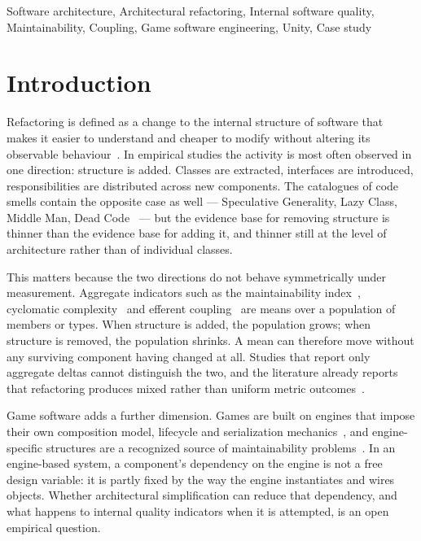 \documentclass{sbc2019}%
\begin{document}
\begin{frontmatter}
\begin{keywords}
Software architecture, Architectural refactoring, Internal software quality, Maintainability, Coupling, Game software engineering, Unity, Case study
\end{keywords}

\end{frontmatter}


\section{Introduction}

Refactoring is defined as a change to the internal structure of software that
makes it easier to understand and cheaper to modify without altering its
observable behaviour~\cite{fowler2018,mens2004}. In empirical studies the
activity is most often observed in one direction: structure is added. Classes
are extracted, interfaces are introduced, responsibilities are distributed
across new components. The catalogues of code smells contain the opposite case
as well --- Speculative Generality, Lazy Class, Middle Man, Dead Code~\cite{fowler2018}
--- but the evidence base for removing structure is thinner
than the evidence base for adding it, and thinner still at the level of
architecture rather than of individual classes.

This matters because the two directions do not behave symmetrically under
measurement. Aggregate indicators such as the maintainability index~\cite{coleman1994},
cyclomatic complexity~\cite{mccabe1976} and efferent
coupling~\cite{martin2003} are means over a population of members or types.
When structure is added, the population grows; when structure is removed, the
population shrinks. A mean can therefore move without any surviving component
having changed at all. Studies that report only aggregate deltas cannot
distinguish the two, and the literature already reports that refactoring
produces mixed rather than uniform metric outcomes~\cite{szoke2017,bavota2015,palomba2018}.

Game software adds a further dimension. Games are built on engines that impose
their own composition model, lifecycle and serialization mechanics~\cite{aleem2016,politowski2025},
and engine-specific structures are a recognized source of maintainability
problems~\cite{nardone2023,borrelli2020}. In an engine-based system, a component's
dependency on the engine is not a free design variable: it is partly fixed by
the way the engine instantiates and wires objects. Whether architectural
simplification can reduce that dependency, and what happens to internal quality
indicators when it is attempted, is an open empirical question.
\end{document}
